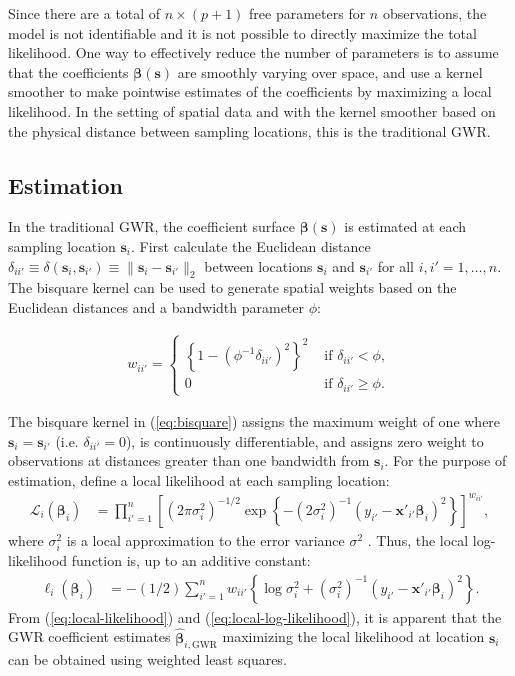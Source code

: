 \documentclass[authoryear, review, 11pt]{elsarticle}
\begin{document}
	Since there are a total of $n \times (p+1)$ free parameters for $n$ observations, the model is not identifiable and it is not possible to directly maximize the total likelihood. One way to effectively reduce the number of parameters is to assume that the coefficients $\bm{\beta}(\bm{s})$ are smoothly varying over space, and use a kernel smoother to make pointwise estimates of the coefficients by maximizing a local likelihood. In the setting of spatial data and with the kernel smoother based on the physical distance between sampling locations, this is the traditional GWR.
		
	\subsection{Estimation}		
	In the traditional GWR, the coefficient surface $\bm{\beta}(\bm{s})$ is estimated at each sampling location $\bm{s}_i$. First calculate the Euclidean distance $\delta_{ii'} \equiv \delta\left(\bm{s}_i, \bm{s}_{i'}\right) \equiv \|\bm{s}_i  -\bm{s}_{i'}\|_2$ between locations $\bm{s}_i$ and $\bm{s}_{i'}$ for all $i, i' = 1, \dots, n$. The bisquare kernel can be used to generate spatial weights based on the Euclidean distances and a bandwidth parameter $\phi$:
	
	\begin{align}\label{eq:bisquare}
		w_{ii'} = \begin{cases} \left\{1-\left(\phi^{-1}\delta_{ii'}\right)^2\right\}^2 &\mbox{ if } \delta_{ii'} < \phi, \\ 0 &\mbox{ if } \delta_{ii'} \geq \phi. \end{cases}
	\end{align}
	
	The bisquare kernel in (\ref{eq:bisquare}) assigns the maximum weight of one where $\bm{s}_i = \bm{s}_{i'}$ (i.e. $\delta_{ii'}=0$), is continuously differentiable, and assigns zero weight to observations at distances greater than one bandwidth from $\bm{s}_i$. For the purpose of estimation, define a local likelihood at each sampling location:
	\begin{align}\label{eq:local-likelihood}
		\mathcal{L}_i \left(\bm{\beta}_i \right) &= \prod_{i'=1}^n \left[ \left(2 \pi \sigma^2_i  \right)^{-1/2}  \exp\left\{-\left(2 \sigma^2_i\right)^{-1}  \left(y_{i'} - \bm{x}'_{i'} \bm{\beta}_i \right)^2 \right\} \right] ^ {w_{ii'}},
	\end{align}			
	where $\sigma_i^2$ is a local approximation to the error variance $\sigma^2$ \citep{Fotheringham:2002}. Thus, the local log-likelihood function is, up to an additive constant:
	\begin{align}\label{eq:local-log-likelihood}
		\ell_i\left(\bm{\beta}_i\right) &= -(1/2) \sum_{i'=1}^n w_{ii'} \left\{ \log{\sigma^2_i}  + \left(\sigma^2_i\right)^{-1}  \left(y_{i'} - \bm{x}'_{i'} \bm{\beta}_i \right)^2 \right\}.
	\end{align}
	From (\ref{eq:local-likelihood}) and (\ref{eq:local-log-likelihood}), it is apparent that the GWR coefficient estimates $\hat{\bm{\beta}}_{i,\text{GWR}}$ maximizing the local likelihood at location $\bm{s}_i$ can be obtained using weighted least squares. 
	
\end{document}
